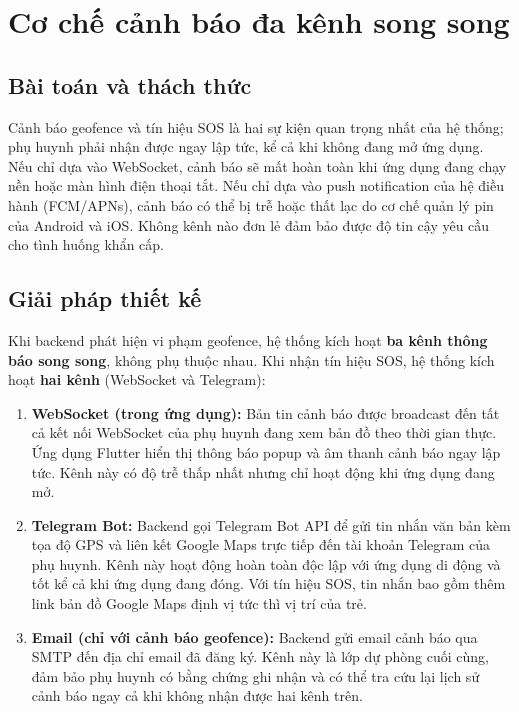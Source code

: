 \documentclass[../DoAn.tex]{subfiles}
\begin{document}
\section{Cơ chế cảnh báo đa kênh song song}
\label{section:5.4}

\subsection{Bài toán và thách thức}

Cảnh báo geofence và tín hiệu SOS là hai sự kiện quan trọng nhất của hệ thống; phụ huynh phải nhận được ngay lập tức, kể cả khi không đang mở ứng dụng. Nếu chỉ dựa vào WebSocket, cảnh báo sẽ mất hoàn toàn khi ứng dụng đang chạy nền hoặc màn hình điện thoại tắt. Nếu chỉ dựa vào push notification của hệ điều hành (FCM/APNs), cảnh báo có thể bị trễ hoặc thất lạc do cơ chế quản lý pin của Android và iOS. Không kênh nào đơn lẻ đảm bảo được độ tin cậy yêu cầu cho tình huống khẩn cấp.

\subsection{Giải pháp thiết kế}

Khi backend phát hiện vi phạm geofence, hệ thống kích hoạt \textbf{ba kênh thông báo song song}, không phụ thuộc nhau. Khi nhận tín hiệu SOS, hệ thống kích hoạt \textbf{hai kênh} (WebSocket và Telegram):

\begin{enumerate}
    \item \textbf{WebSocket (trong ứng dụng):} Bản tin cảnh báo được broadcast đến tất cả kết nối WebSocket của phụ huynh đang xem bản đồ theo thời gian thực. Ứng dụng Flutter hiển thị thông báo popup và âm thanh cảnh báo ngay lập tức. Kênh này có độ trễ thấp nhất nhưng chỉ hoạt động khi ứng dụng đang mở.

    \item \textbf{Telegram Bot:} Backend gọi Telegram Bot API để gửi tin nhắn văn bản kèm tọa độ GPS và liên kết Google Maps trực tiếp đến tài khoản Telegram của phụ huynh. Kênh này hoạt động hoàn toàn độc lập với ứng dụng di động và tốt kể cả khi ứng dụng đang đóng. Với tín hiệu SOS, tin nhắn bao gồm thêm link bản đồ Google Maps định vị tức thì vị trí của trẻ.

    \item \textbf{Email (chỉ với cảnh báo geofence):} Backend gửi email cảnh báo qua SMTP đến địa chỉ email đã đăng ký. Kênh này là lớp dự phòng cuối cùng, đảm bảo phụ huynh có bằng chứng ghi nhận và có thể tra cứu lại lịch sử cảnh báo ngay cả khi không nhận được hai kênh trên.
\end{enumerate}
\end{document}
